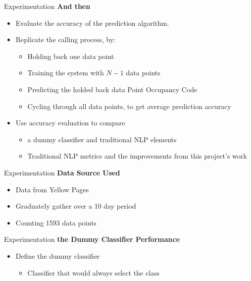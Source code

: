 
\begin{frame}[label=exp]{Experimentation}
	\textbf{And then}
	
	\begin{itemize}
	\item Evaluate the accuracy of the prediction algorithm.
	\item Replicate the calling process, by:
		\begin{itemize}
			\item Holding back one data point
			\item Training the system with $N-1$ data points
			\item Predicting the holded back data Point Occupancy Code
			\item Cycling through all data points, to get average prediction accuracy
		\end{itemize}
	\item Use accuracy evaluation to compare
		\begin{itemize}
			\item a dummy classifier and traditional NLP elements
			\item Traditional NLP metrics and the improvements from this project's work
		\end{itemize}
	\end{itemize}
	
\end{frame}

\begin{frame}[label=exp]{Experimentation}
	\textbf{Data Source Used}
	
	\begin{itemize}
		\item Data from Yellow Pages
		\item Graduately gather over a 10 day period
		\item Counting 1593 data points
	\end{itemize}
	
\end{frame}



\begin{frame}[label=exp]{Experimentation}
	\textbf{the Dummy Classifier Performance}
	
	\begin{itemize}
		\item Define the dummy classifier 
		\begin{itemize}
			\item Classifier that would always select the class
		\end{itemize}
		
	\end{itemize}
	
\end{frame}

